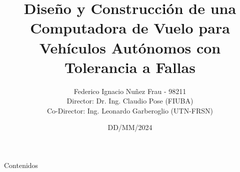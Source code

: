 \documentclass[10pt]{beamer}
\author[Federico Ignacio Nuñez Frau]{Federico Ignacio Nuñez Frau - 98211\\[1ex]  {\small Director: Dr. Ing. Claudio Pose (FIUBA)}\\ {\small Co-Director: Ing. Leonardo Garberoglio (UTN-FRSN)}}
\title[]{Diseño y Construcción de una Computadora de Vuelo para Vehículos Autónomos con Tolerancia a Fallas}
\date{DD/MM/2024}
\begin{document}
\begin{frame}
  \titlepage
\end{frame}

\begin{frame}{Contenidos}
  \tableofcontents
\end{frame}




%












\end{document}
